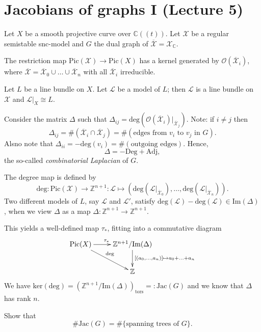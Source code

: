 \section{Jacobians of graphs I (Lecture 5)}
Let $X$ be a smooth projective curve over $\mathbb{C}((t))$. Let $\mathcal{X}$ be a regular semistable snc-model and $G$ the dual graph of $\overline{\mathcal{X}} = \mathcal{X}_{\mathbb{C}}$.

The restriction map $\mathrm{Pic}(\mathcal{X}) \to \mathrm{Pic}(X)$ has a kernel generated by $\mathcal{O}(\overline{\mathcal{X}}_i)$, where $\overline{\mathcal{X}} = \overline{\mathcal{X}}_0 \cup \ldots \cup \overline{\mathcal{X}}_n$ with all $\overline{\mathcal{X}}_i$ irreducible.

Let $L$ be a line bundle on $X$. Let $\mathcal{L}$ be a model of $L$; then $\mathcal{L}$ is a line bundle on $\mathcal{X}$ and $\mathcal{L}|_X \cong L$.

Consider the matrix $\Delta$ such that $\Delta_{ij} = \mathrm{deg}(\mathcal{O}(\overline{\mathcal{X}}_i)|_{\overline{\mathcal{X}}_j})$. Note: if $i \neq j$ then $$\Delta_{ij} = \#(\overline{\mathcal{X}}_i \cap \overline{\mathcal{X}}_j) = \#(\textrm{edges from } v_i \textrm{ to } v_j \textrm{ in } G).$$
Alsno note that $\Delta_{ii} = -\mathrm{deg}(v_i) = \#(\textrm{outgoing edges})$. Hence, $$\Delta = -\mathrm{Deg} + \mathrm{Adj},$$ the so-called \emph{combinatorial Laplacian} of $G$.

The degree map is defined by $$\mathrm{deg} \colon \mathrm{Pic}(\mathcal{X}) \to \mathbb{Z}^{n+1} \colon \mathcal{L} \mapsto (\mathrm{deg}(\mathcal{L}|_{\overline{\mathcal{X}}_0}),\ldots, \mathrm{deg}(\mathcal{L}|_{\overline{\mathcal{X}}_n})).$$
Two different models of $L$, say $\mathcal{L}$ and $\mathcal{L}'$, satisfy $\mathrm{deg}(\mathcal{L}) - \mathrm{deg}(\mathcal{L}) \in \mathrm{Im}(\Delta)$, when we view $\Delta$ as a map $\Delta \colon \mathbb{Z}^{n+1} \to \mathbb{Z}^{n+1}$.

This yields a well-defined map $\tau_{*}$, fitting into a commutative diagram
\[
\xymatrix{
\mathrm{Pic}(X) \ar[r]^{\tau_{*}} \ar[dr]^{\mathrm{deg}} & \mathbb{Z}^{n+1}/\mathrm{Im}(\Delta) \ar[d]^{[(a_0,\ldots,a_n)] \mapsto a_0 + \ldots + a_n} \\
 & \mathbb{Z} 
}
\]
We have $\mathrm{ker}(\mathrm{deg}) = (\mathbb{Z}^{n+1}/\mathrm{Im}(\Delta))_{\mathrm{tors}} =\colon \mathrm{Jac}(G)$ and we know that $\Delta$ has rank $n$.

\begin{exercise}
	Show that
	\[
		\#\mathrm{Jac}(G) = \#\{\text{spanning trees of } G\}.
	\]
\end{exercise}

